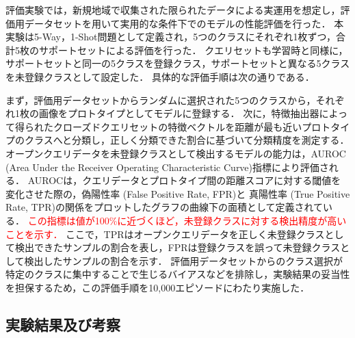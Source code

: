 \documentclass[a4paper,11pt,nomag]{jsreport}
\begin{document}
評価実験では，新規地域で収集された限られたデータによる実運用を想定し，評価用データセットを用いて実用的な条件下でのモデルの性能評価を行った．
本実験は5-Way，1-Shot問題として定義され，5つのクラスにそれぞれ1枚ずつ，合計5枚のサポートセットによる評価を行った．
クエリセットも学習時と同様に，サポートセットと同一の5クラスを登録クラス，サポートセットと異なる5クラスを未登録クラスとして設定した．
具体的な評価手順は次の通りである．

まず，評価用データセットからランダムに選択された5つのクラスから，それぞれ1枚の画像をプロトタイプとしてモデルに登録する．
次に，特徴抽出器によって得られたクローズドクエリセットの特徴ベクトルを距離が最も近いプロトタイプのクラスへと分類し，正しく分類できた割合に基づいて分類精度を測定する．
オープンクエリデータを未登録クラスとして検出するモデルの能力は，AUROC (Area Under the Receiver Operating Characteristic Curve)指標により評価される．
AUROCは，クエリデータとプロトタイプ間の距離スコアに対する閾値を変化させた際の，偽陽性率 (False Positive Rate, FPR)と
真陽性率 (True Positive Rate, TPR)の関係をプロットしたグラフの曲線下の面積として定義されている．
\textcolor{red}{この指標は値が100\%に近づくほど，未登録クラスに対する検出精度が高いことを示す．}
ここで，TPRはオープンクエリデータを正しく未登録クラスとして検出できたサンプルの割合を表し，FPRは登録クラスを誤って未登録クラスとして検出したサンプルの割合を示す．
評価用データセットからのクラス選択が特定のクラスに集中することで生じるバイアスなどを排除し，実験結果の妥当性を担保するため，この評価手順を10,000エピソードにわたり実施した．

\subsection{実験結果及び考察}
\end{document}
